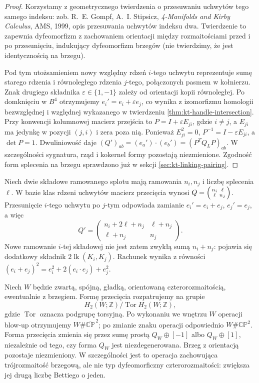 \begin{proof}
Korzystamy z geometrycznego twierdzenia o
przesuwaniu uchwytów tego samego indeksu:
zob. R.~E. Gompf, A.~I. Stipsicz,
\emph{4-Manifolds and Kirby Calculus}, AMS, 1999,
opis przesuwania uchwytów indeksu dwa.
Twierdzenie to zapewnia dyfeomorfizm z zachowaniem
orientacji między rozmaitościami przed i po
przesunięciu, indukujący dyfeomorfizm brzegów
(nie twierdzimy, że jest identycznością na brzegu).

Pod tym utożsamieniem nowy względny rdzeń
$i$-tego uchwytu reprezentuje sumę starego
rdzenia i równoległego rdzenia $j$-tego,
połączonych pasmem w kołnierzu. Znak drugiego
składnika $\varepsilon\in\{1,-1\}$ zależy
od orientacji kopii równoległej. Po domknięciu
w $B^4$ otrzymujemy $e_i'=e_i+\varepsilon e_j$,
co wynika z izomorfizmu homologii bezwzględnej
i względnej wykazanego w twierdzeniu
\ref{thm:kt-handle-intersection}.
Przy konwencji kolumnowej macierz przejścia
to $P=I+\varepsilon E_{ji}$, gdzie $i\ne j$,
a $E_{ji}$ ma jedynkę w pozycji $(j,i)$
i zera poza nią. Ponieważ $E_{ji}^2=0$,
$P^{-1}=I-\varepsilon E_{ji}$, a $\det P=1$.
Dwuliniowość daje
$(Q')_{ab}=(e_a')\cdot(e_b')=(P^TQ_LP)_{ab}$.
W szczególności sygnatura, rząd i kokernel
formy pozostają niezmienione. Zgodność form
splecenia na brzegu sprawdzono już w sekcji
\ref{sec:kt-linking-pairing}.
\end{proof}

\begin{przyklad}
Niech dwie składowe ramowanego splotu mają ramowania
$n_i,n_j$ i liczbę splecenia $\ell$. W bazie klas
rdzeni uchwytów macierz przecięcia wynosi
$Q=\begin{psmallmatrix}n_i&\ell\\\ell&n_j\end{psmallmatrix}$.
Przesunięcie $i$-tego uchwytu po $j$-tym odpowiada
zamianie $e_i'=e_i+e_j$, $e_j'=e_j$, a więc
\[
Q'=\begin{pmatrix}n_i+2\ell+n_j&\ell+n_j\\
\ell+n_j&n_j\end{pmatrix}.
\]
Nowe ramowanie $i$-tej składowej nie jest zatem zwykłą
sumą $n_i+n_j$: pojawia się dodatkowy składnik
$2\operatorname{lk}(K_i,K_j)$. Rachunek wynika z
równości $(e_i+e_j)^2=e_i^2+2(e_i\cdot e_j)+e_j^2$.
\end{przyklad}

\begin{stwierdzenie}[Blow-up]
Niech $W$ będzie zwartą, spójną, gładką,
orientowaną czterorozmaitością, ewentualnie z brzegiem.
Formę przecięcia rozpatrujemy na grupie
\[
H_2(W;\mathbb Z)/\operatorname{Tor}H_2(W;\mathbb Z),
\]
gdzie $\operatorname{Tor}$ oznacza podgrupę torsyjną.
Po wykonaniu we wnętrzu $W$ operacji blow-up otrzymujemy
$W\#\overline{\mathbb{CP}}^{\,2}$; po zmianie znaku
operacji odpowiednio $W\#\mathbb{CP}^2$.
Forma przecięcia zmienia się przez sumę prostą
$Q_W\oplus[-1]$ albo $Q_W\oplus[1]$,
niezależnie od tego, czy forma $Q_W$ jest
niezdegenerowana. Brzeg z orientacją pozostaje
niezmieniony. W szczególności jest to operacja
zachowująca trójrozmaitość brzegową, ale nie
typ dyfeomorficzny czterorozmaitości: zwiększa
jej drugą liczbę Bettiego o jeden.
\end{stwierdzenie}

